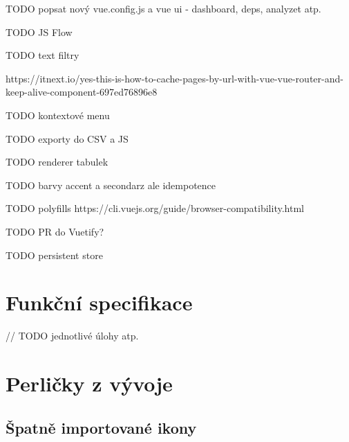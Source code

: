 
TODO popsat nový vue.config.js a vue ui - dashboard, deps, analyzet atp.

TODO JS Flow

TODO text filtry

https://itnext.io/yes-this-is-how-to-cache-pages-by-url-with-vue-vue-router-and-keep-alive-component-697ed76896e8

TODO kontextové menu

TODO exporty do CSV a JS

TODO renderer tabulek

TODO barvy accent a secondarz ale idempotence

TODO polyfills https://cli.vuejs.org/guide/browser-compatibility.html

TODO PR do Vuetify?

TODO persistent store


\section{Funkční specifikace}

// TODO jednotlivé úlohy atp.


\section{Perličky z vývoje}

\subsection{Špatně importované ikony}


